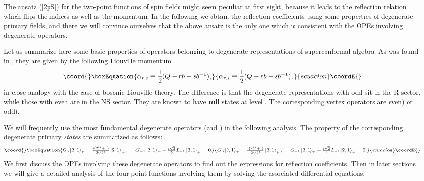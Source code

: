 \documentclass[a4paper,12pt]{article}
\def\paragraph#1{
    \vskip6mm\noindent{\it #1}\par\vskip3mm}
\providecommand{\ket}[1]{\left|{#1}\right>}
\providecommand{\tfrac}[2]{{\textstyle\frac{#1}{#2}}}
\providecommand{\ep}{{\epsilon}}
\providecommand{\bep}{{\bar{\epsilon}}}
\begin{document}
   The ansatz (\ref{2pS}) for the two-point functions of spin fields
 might seem peculiar at first sight, because it leads to the reflection
 relation which flips the indices \myHighlight{$\ep,\bep$}\coordHE{} as well as the momentum.
 In the following we obtain the reflection coefficients
 using some properties of degenerate primary fields, and there
 we will convince ourselves that the above ansatz is the only one
 which is consistent with the OPEs involving degenerate operators.

\paragraph{Degenerate fields and their OPEs}
   Let us summarize here some basic properties of
 operators belonging to degenerate representations of
 superconformal algebra.
 As was found in \cite{BKT,FQS,Nam}, they are given by the following
 Liouville momentum \coordHE{}
\begin{equation}\coord{}\boxEquation{
  \alpha_{r,s} \equiv \frac{1}{2}(Q-rb-sb^{-1}),
}{
  \alpha_{r,s} \equiv \frac{1}{2}(Q-rb-sb^{-1}),
}{ecuacion}\coordE{}\end{equation}
 in close analogy with the case of bosonic Liouville theory.
 The difference is that the degenerate representations with odd
 \coordHE{} sit in the R sector, while those with even \coordHE{} are in the
 NS sector.
 They are known to have null states at level \coordHE{}.
 The corresponding vertex operators are \coordHE{} even)
 or \coordHE{} odd).

   We will frequently use the most fundamental degenerate operators
 \coordHE{} (and \coordHE{})
 in the following analysis.
 The property of the corresponding degenerate primary
 {\it states} \myHighlight{$\ket{2,1}_\pm$}\coordHE{} are summarized as follows:
\begin{equation}\coord{}\boxEquation{
  G_0\ket{2,1}_\pm = \tfrac{i(2b^2+1)}{2\sqrt{2}b}\ket{2,1}_\mp,~~~~
  G_{-1}\ket{2,1}_\pm + \tfrac{i\sqrt{2}}{b}L_{-1}\ket{2,1}_\mp =0.
}{
  G_0\ket{2,1}_\pm = \tfrac{i(2b^2+1)}{2\sqrt{2}b}\ket{2,1}_\mp,~~~~
  G_{-1}\ket{2,1}_\pm + \tfrac{i\sqrt{2}}{b}L_{-1}\ket{2,1}_\mp =0.
}{ecuacion}\coordE{}\end{equation}
 We first discuss the OPEs involving these degenerate operators
 to find out the expressions for reflection coefficients.
 Then in later sections we will give a detailed analysis of
 the four-point functions involving them by solving
 the associated differential equations.
  
\end{document}
